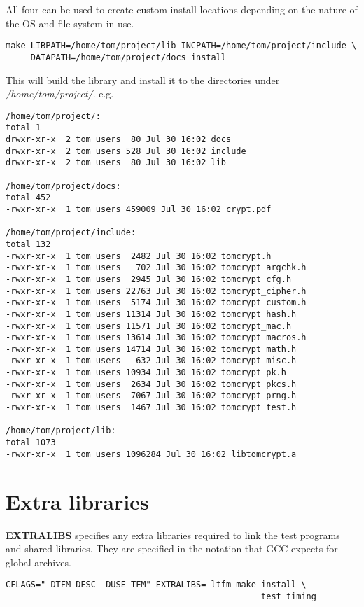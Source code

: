 \documentclass[synpaper]{book}
\newcommand{\mysection}[1]    %
	{                   %
	\section{#1}
   \markboth{\textsf{www.libtom.org}}{\thesection ~ {#1}}
	}
\begin{document}
All four can be used to create custom install locations depending on the nature of the OS and file system in use.

\begin{verbatim}
make LIBPATH=/home/tom/project/lib INCPATH=/home/tom/project/include \
     DATAPATH=/home/tom/project/docs install
\end{verbatim}

This will build the library and install it to the directories under \textit{/home/tom/project/}.  e.g.

\begin{small}
\begin{verbatim}
/home/tom/project/:
total 1
drwxr-xr-x  2 tom users  80 Jul 30 16:02 docs
drwxr-xr-x  2 tom users 528 Jul 30 16:02 include
drwxr-xr-x  2 tom users  80 Jul 30 16:02 lib

/home/tom/project/docs:
total 452
-rwxr-xr-x  1 tom users 459009 Jul 30 16:02 crypt.pdf

/home/tom/project/include:
total 132
-rwxr-xr-x  1 tom users  2482 Jul 30 16:02 tomcrypt.h
-rwxr-xr-x  1 tom users   702 Jul 30 16:02 tomcrypt_argchk.h
-rwxr-xr-x  1 tom users  2945 Jul 30 16:02 tomcrypt_cfg.h
-rwxr-xr-x  1 tom users 22763 Jul 30 16:02 tomcrypt_cipher.h
-rwxr-xr-x  1 tom users  5174 Jul 30 16:02 tomcrypt_custom.h
-rwxr-xr-x  1 tom users 11314 Jul 30 16:02 tomcrypt_hash.h
-rwxr-xr-x  1 tom users 11571 Jul 30 16:02 tomcrypt_mac.h
-rwxr-xr-x  1 tom users 13614 Jul 30 16:02 tomcrypt_macros.h
-rwxr-xr-x  1 tom users 14714 Jul 30 16:02 tomcrypt_math.h
-rwxr-xr-x  1 tom users   632 Jul 30 16:02 tomcrypt_misc.h
-rwxr-xr-x  1 tom users 10934 Jul 30 16:02 tomcrypt_pk.h
-rwxr-xr-x  1 tom users  2634 Jul 30 16:02 tomcrypt_pkcs.h
-rwxr-xr-x  1 tom users  7067 Jul 30 16:02 tomcrypt_prng.h
-rwxr-xr-x  1 tom users  1467 Jul 30 16:02 tomcrypt_test.h

/home/tom/project/lib:
total 1073
-rwxr-xr-x  1 tom users 1096284 Jul 30 16:02 libtomcrypt.a
\end{verbatim}
\end{small}

\mysection{Extra libraries}
\textbf{EXTRALIBS} specifies any extra libraries required to link the test programs and shared libraries.  They are specified in the notation
that GCC expects for global archives.

\begin{verbatim}
CFLAGS="-DTFM_DESC -DUSE_TFM" EXTRALIBS=-ltfm make install \
                                                   test timing
\end{verbatim}
\end{document}
